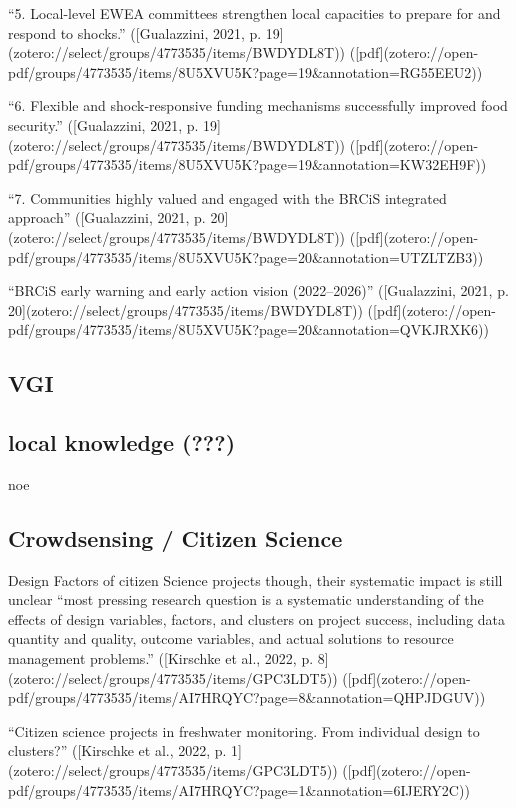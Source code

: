 {“5. Local-level EWEA committees strengthen local capacities to prepare for and respond to shocks.” ([Gualazzini, 2021, p. 19](zotero://select/groups/4773535/items/BWDYDL8T)) ([pdf](zotero://open-pdf/groups/4773535/items/8U5XVU5K?page=19&annotation=RG55EEU2))

“6. Flexible and shock-responsive funding mechanisms successfully improved food security.” ([Gualazzini, 2021, p. 19](zotero://select/groups/4773535/items/BWDYDL8T)) ([pdf](zotero://open-pdf/groups/4773535/items/8U5XVU5K?page=19&annotation=KW32EH9F))

“7. Communities highly valued and engaged with the BRCiS integrated approach” ([Gualazzini, 2021, p. 20](zotero://select/groups/4773535/items/BWDYDL8T)) ([pdf](zotero://open-pdf/groups/4773535/items/8U5XVU5K?page=20&annotation=UTZLTZB3))

“BRCiS early warning and early action vision (2022–2026)” ([Gualazzini, 2021, p. 20](zotero://select/groups/4773535/items/BWDYDL8T)) ([pdf](zotero://open-pdf/groups/4773535/items/8U5XVU5K?page=20&annotation=QVKJRXK6))


\subsection{VGI}



\subsection{local knowledge (???)}
noe

\subsection{Crowdsensing / Citizen Science}
Design Factors of citizen Science projects
though, their systematic impact is still unclear “most pressing research question is a systematic understanding of the effects of design variables, factors, and clusters on project success, including data quantity and quality, outcome variables, and actual solutions to resource management problems.” ([Kirschke et al., 2022, p. 8](zotero://select/groups/4773535/items/GPC3LDT5)) ([pdf](zotero://open-pdf/groups/4773535/items/AI7HRQYC?page=8&annotation=QHPJDGUV))

“Citizen science projects in freshwater monitoring. From individual design to clusters?” ([Kirschke et al., 2022, p. 1](zotero://select/groups/4773535/items/GPC3LDT5)) ([pdf](zotero://open-pdf/groups/4773535/items/AI7HRQYC?page=1&annotation=6IJERY2C))

}
